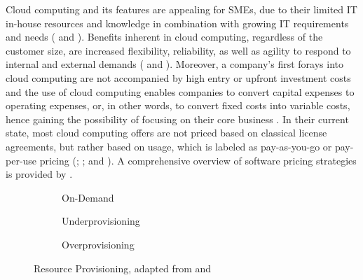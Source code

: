 Cloud computing and its features are appealing for \acp{SME}, due to their limited \ac{IT} in-house resources and knowledge in combination with growing \ac{IT} requirements and needs (\citealp[p. 398]{Weinhardt2009} and \citealp{Karabek2011}). Benefits inherent in cloud computing, regardless of the customer size, are increased flexibility, reliability, as well as agility to respond to internal and external demands (\citealp[p. 51]{Vaquero2009} and \citealp[p. 129]{Iyer2010}). Moreover, a company's first forays into cloud computing are not accompanied by high entry or upfront investment costs and the use of cloud computing enables companies to convert capital expenses to operating expenses, or, in other words, to convert fixed costs into variable costs, hence gaining the possibility of focusing on their core business \citep[pp. 51-53]{Armbrust2010}. In their current state, most cloud computing offers are not priced based on classical license agreements, but rather based on usage, which is labeled as pay-as-you-go or pay-per-use pricing (\citealp[pp. 50-54]{Vaquero2009}; \citealp[pp. 51-53,58]{Armbrust2010}; and \citealp[p. 2]{Iyer2010}). A comprehensive overview of software pricing strategies is provided by \nolinebreak\citet{Lehmann2009}.

\begin{figure}[t]
	\centering
	\begin{subfigure}{.75\textwidth}
		\centering
		
		\caption{On-Demand}\label{fig:rpc}
	\end{subfigure}
	\begin{subfigure}[b]{.75\textwidth}
		\centering
		
		\caption{Underprovisioning}\label{fig:rpu}
	\end{subfigure}
	\begin{subfigure}[b]{.75\textwidth}
		\centering
		
		\caption{Overprovisioning}\label{fig:rpo}
	\end{subfigure}
	\caption[Resource Provisioning]{Resource Provisioning, adapted from \citet[p. 54]{Armbrust2010} and \citet[p. 127]{Iyer2010}}
	\label{fig:rp}
\end{figure}

